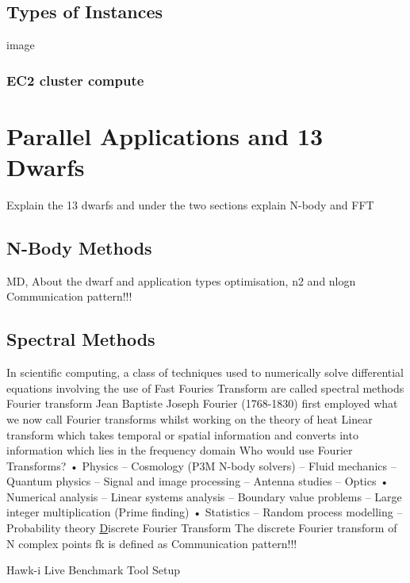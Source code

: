 \documentclass[12pt,a4paper]{report}
\begin{document}
\subsection{Types of Instances}
  
image{}

\subsubsection{EC2 cluster compute} 


\section{Parallel Applications and 13 Dwarfs}  
Explain the 13 dwarfs and under the two sections explain N-body and FFT  
\subsection{N-Body Methods}  
MD, About the dwarf and application types optimisation, n2 and nlogn  
Communication pattern!!!  
\subsection{Spectral Methods}  
In scientific computing, a class of techniques used to numerically solve differential equations involving the use of Fast Fouries Transform are called spectral methods  
Fourier transform  
Jean Baptiste Joseph Fourier (1768-1830) first employed what we now call Fourier transforms whilst working on the theory of heat   
Linear transform which takes temporal or spatial information and converts into information which lies in the frequency domain  
Who would use Fourier Transforms?   
• Physics   
– Cosmology (P3M N-body solvers)   
– Fluid mechanics   
– Quantum physics   
– Signal and image processing   
– Antenna studies   
– Optics   
• Numerical analysis   
– Linear systems analysis   
– Boundary value problems   
– Large integer multiplication (Prime finding)   
• Statistics   
– Random process modelling   
– Probability theory  
{\underline Discrete Fourier Transform}  
The discrete Fourier transform of N complex points fk is defined as   
Communication pattern!!!  
 


Hawk-i Live Benchmark Tool Setup
\end{document}
